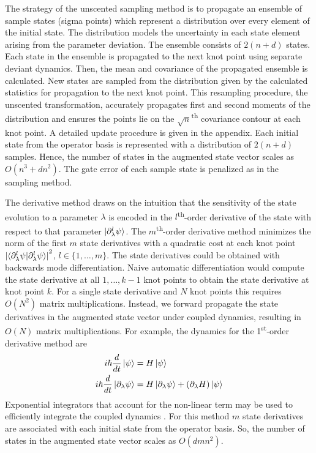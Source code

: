 \documentclass[
  amsfonts,
  amsmath,
  tbtags,
  amssymb,
  aps,
  nobibnotes,
  twocolumn,
  superscriptaddress,
]{revtex4-2}
\begin{document}
The strategy of the unscented sampling method is to
propagate an ensemble of sample states (sigma points) which represent a distribution
over every element of the initial state. The distribution
models the uncertainty in each state element arising from the
parameter deviation. The ensemble consists of $2 (n + d)$ states.
Each state in the
ensemble is propagated to the next
knot point using separate deviant dynamics. Then, the mean and covariance of
the propagated ensemble is calculated. New states are sampled from the distribution
given by the calculated statistics for propagation to the next knot point.
This resampling procedure, the unscented transformation, accurately propagates
first and second moments of the distribution and ensures the points
lie on the $\sqrt{n}$\textsuperscript{th}
covariance contour at each knot point. A detailed update procedure is given
in the appendix. Each initial state from the operator basis
is represented with a distribution of $2 (n + d)$ samples. Hence,
the number of states in the augmented state vector scales as $O(n^{3} + dn^{2})$.
The gate error of each sample state is penalized as in the sampling method.

The derivative method draws on the intuition that
the sensitivity of the state evolution to a parameter
$\lambda$ is encoded in the $l$\textsuperscript{th}-order
derivative of the state with respect to that parameter
$\ket{\partial_{\lambda}^{l} \psi}$. The $m$\textsuperscript{th}-order
derivative method minimizes the norm of the first $m$
state derivatives with a quadratic cost at each knot point
${\lvert \braket{\partial^{l}_{\lambda} \psi | \partial^{l}_{\lambda} \psi}
  \rvert}^{2}$, $l \in \{1, \dots, m\}$.
The state derivatives could be obtained with backwards mode differentiation.
Naive automatic differentiation would compute
the state derivative at all $1, \dots, k - 1$ knot points
to obtain the state derivative at knot point $k$.
For a single state derivative and $N$ knot points this
requires $O(N^2)$ matrix multiplications.
Instead, we forward propagate the state derivatives in the
augmented state vector under coupled dynamics, resulting in
$O(N)$ matrix multiplications. For example, the dynamics
for the 1\textsuperscript{st}-order derivative method are
\begin{align}
  i \hbar \frac{d}{dt} \ket{\psi} &= H \ket{\psi}\\
  i \hbar \frac{d}{dt} \ket{\partial_{\lambda}\psi} &=
  H \ket{\partial_{\lambda} \psi} +
  (\partial_{\lambda} H) \ket{\psi}
\end{align}
Exponential integrators that account for the non-linear
term may be used to efficiently integrate the coupled dynamics
\cite{berland2005solving, einkemmer2017performance}.
For this method $m$ state derivatives are associated with each
initial state from the operator basis.
So, the number of states in the augmented state vector scales as
$O(dmn^{2})$.
\end{document}
